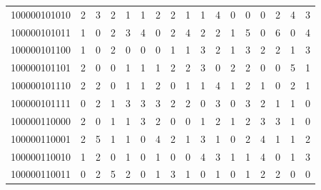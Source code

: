 \documentclass[10pt,a4paper]{article}
\begin{document}
\begin{longtable}{ |c|c|c|c|c|c|c|c|c|c|c|c|c|c|c|c|c| }
    100000101010              & 2                            & 3                                & 2                            & 1                              & 1   & 2   & 2   & 1   & 1   & 4   & 0   & 0   & 0   & 2   & 4   & 3   \\
    100000101011              & 1                            & 0                                & 2                            & 3                              & 4   & 0   & 2   & 4   & 2   & 2   & 1   & 5   & 0   & 6   & 0   & 4   \\
    100000101100              & 1                            & 0                                & 2                            & 0                              & 0   & 0   & 1   & 1   & 3   & 2   & 1   & 3   & 2   & 2   & 1   & 3   \\
    100000101101              & 2                            & 0                                & 0                            & 1                              & 1   & 1   & 2   & 2   & 3   & 0   & 2   & 2   & 0   & 0   & 5   & 1   \\
    100000101110              & 2                            & 2                                & 0                            & 1                              & 1   & 2   & 0   & 1   & 1   & 4   & 1   & 2   & 1   & 0   & 2   & 1   \\
    100000101111              & 0                            & 2                                & 1                            & 3                              & 3   & 3   & 2   & 2   & 0   & 3   & 0   & 3   & 2   & 1   & 1   & 0   \\
    100000110000              & 2                            & 0                                & 1                            & 1                              & 3   & 2   & 0   & 0   & 1   & 2   & 1   & 2   & 3   & 3   & 1   & 0   \\
    100000110001              & 2                            & 5                                & 1                            & 1                              & 0   & 4   & 2   & 1   & 3   & 1   & 0   & 2   & 4   & 1   & 1   & 2   \\
    100000110010              & 1                            & 2                                & 0                            & 1                              & 0   & 1   & 0   & 0   & 4   & 3   & 1   & 1   & 4   & 0   & 1   & 3   \\
    100000110011              & 0                            & 2                                & 5                            & 2                              & 0   & 1   & 3   & 1   & 0   & 1   & 0   & 1   & 2   & 2   & 0   & 0   \\

\end{longtable}
\end{document}
